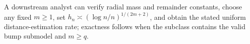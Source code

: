 A downstream analyst can verify radial mass and remainder constants, choose any fixed \(m\geq1\), set \(h_n\asymp(\log n/n)^{1/(2m+2)}\), and obtain the stated uniform distance-estimation rate; exactness follows when the subclass contains the valid bump submodel and \(m\geq q\).